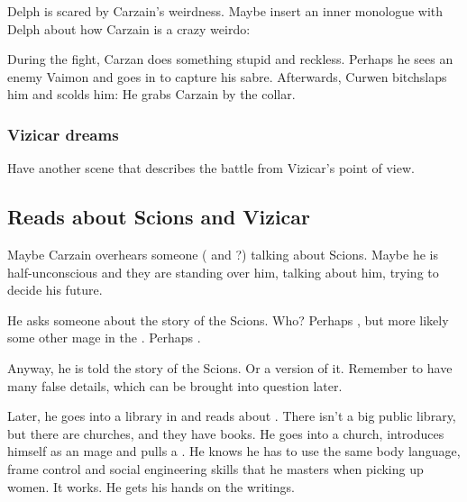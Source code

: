 \begin{garbage}
Delph is scared by Carzain's weirdness. Maybe insert an inner monologue with Delph about how Carzain is a crazy weirdo: 

During the fight, Carzan does something stupid and reckless. 
Perhaps he sees an enemy Vaimon and goes in to capture his sabre. 
Afterwards, Curwen bitchslaps him and scolds him: 
He grabs Carzain by the collar. 





\subsubsection{Vizicar dreams}
Have another scene that describes the battle from Vizicar's point of view. 









\subsection{Reads about Scions and Vizicar}
Maybe Carzain overhears someone (\Esmerel{} and \Racel{}?) talking about Scions. 
Maybe he is half-unconscious and they are standing over him, talking about him, trying to decide his future. 

He asks someone about the story of the Scions. 
Who? 
Perhaps \Racel, but more likely some other mage in the \ishrah. 
Perhaps \Sanyor. 

Anyway, he is told the story of the Scions. Or a version of it. Remember to have many false details, which can be brought into question later. 

Later, he goes into a library in \Forklin{} and reads about \VizicarDurasRespina. 
There isn't a big public library, but there are churches, and they have books. 
He goes into a church, introduces himself as an \ishrah{} mage and pulls a .
He knows he has to use the same body language, frame control and social engineering skills that he masters when picking up women.
It works.
He gets his hands on the writings.


\end{garbage}
